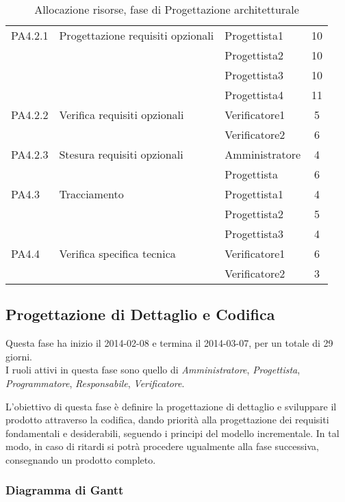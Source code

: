 \begin{table}[H]
\begin{tabular}{ l l l c  }
	\cline{3-4}
	PA4.2.1 & Progettazione requisiti opzionali & Progettista1 & 10\\ 
	& & Progettista2 & 10\\
	& & Progettista3 & 10\\
	& & Progettista4 & 11\\
    \cline{3-4}
	PA4.2.2 & Verifica requisiti opzionali & Verificatore1 &  5\\
	& & Verificatore2 & 6\\
	\cline{3-4}
	PA4.2.3 & Stesura requisiti opzionali & Amministratore &  4\\
	& & Progettista & 6\\
	\cline{3-4}
	PA4.3 & Tracciamento & Progettista1 &  4\\
	& & Progettista2 & 5\\
	& & Progettista3 & 4\\
	\cline{3-4}
	PA4.4 & Verifica specifica tecnica & Verificatore1 &  6\\
	& & Verificatore2 & 3\\
	
	\hline
	\end{tabular}
	\caption{Allocazione risorse, fase di Progettazione architetturale}
	\end{table}
	
	\pagebreak
	\subsection{Progettazione di Dettaglio e Codifica}
	 
Questa fase ha inizio il 2014-02-08 e termina il 2014-03-07, per un totale di 29  giorni. \\
I ruoli attivi in questa fase sono quello di \textit{Amministratore}, \textit{Progettista}, \textit{Programmatore}, \textit{Responsabile}, \textit{Verificatore}.

L'obiettivo di questa fase è definire la progettazione di dettaglio e sviluppare il prodotto attraverso la codifica, dando priorità alla progettazione dei requisiti fondamentali e desiderabili, seguendo i principi del modello incrementale.
In tal modo, in caso di ritardi si potrà procedere ugualmente alla fase successiva, consegnando un prodotto completo.

\subsubsection{Diagramma di Gantt}

